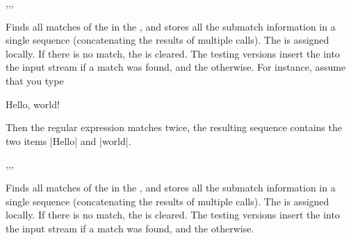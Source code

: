 \documentclass[oneside]{book}
\begin{document}
\begin{function}{\regexExtractAll,\regexExtractAllT,\regexExtractAllF,\regexExtractAllTF}
\begin{syntax}
   
    
    
     
\end{syntax}
Finds all matches of the 
in the , and stores all the submatch information
in a single sequence (concatenating the results of
multiple  calls).
The  is assigned locally. If there is no match,
the  is cleared.
The testing versions insert the  into the input
stream if a match was found, and the  otherwise.
For instance, assume that you type
\begin{codehigh}
\regexExtractAll {\w+} {Hello, world!} \lTmpaSeq
\end{codehigh}
Then the regular expression matches twice, the resulting
sequence contains the two items |{Hello}| and |{world}|.
\end{function}

\begin{function}{\regexVarExtractAll,\regexVarExtractAllT,\regexVarExtractAllF,\regexVarExtractAllTF}
\begin{syntax}
   
    
    
     
\end{syntax}
Finds all matches of the 
in the , and stores all the submatch information
in a single sequence (concatenating the results of
multiple  calls).
The  is assigned locally. If there is no match,
the  is cleared.
The testing versions insert the  into the input
stream if a match was found, and the  otherwise.
\end{function}
\end{document}
